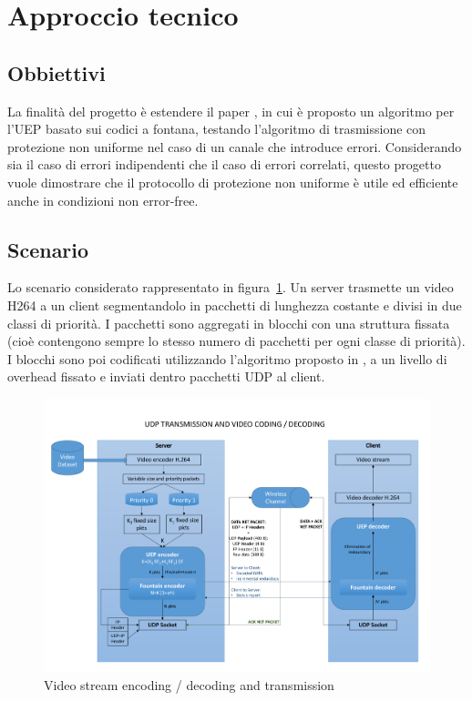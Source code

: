 \documentclass[italian, a4paper, 12pt]{article}
\begin{document}
\section{Approccio tecnico}
\subsection{Obbiettivi} %
La finalità del progetto è estendere il paper \cite{uep}, in cui è proposto un algoritmo per l'UEP basato sui codici a fontana, testando l'algoritmo di trasmissione con protezione non uniforme nel caso di un canale che introduce errori.
%
Considerando sia il caso di errori indipendenti che il caso di errori correlati, questo progetto vuole dimostrare che il protocollo di protezione non uniforme è utile ed efficiente anche in condizioni non error-free.
\subsection{Scenario} %
Lo scenario considerato rappresentato in figura~\ref{fig:UDP}. Un
server trasmette un video H264 a un client segmentandolo in pacchetti
di lunghezza costante e divisi in due classi di priorità. I pacchetti
sono aggregati in blocchi con una struttura fissata (cioè contengono
sempre lo stesso numero di pacchetti per ogni classe di priorità). I
blocchi sono poi codificati utilizzando l'algoritmo proposto in
\cite{uep}, a un livello di overhead fissato e inviati dentro
pacchetti UDP al client.
%
\begin{figure}[H]
    \centering
        \includegraphics[clip, trim=0cm 1cm 0cm 1cm, width=1.00\textwidth]{UDP.pdf}
    \caption{Video stream encoding / decoding and transmission}
    \label{fig:UDP}
\end{figure}
\end{document}
